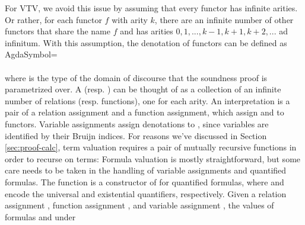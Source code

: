 \documentclass{lipics-v2021}
\begin{document}
For VTV, we avoid this issue by assuming that every functor has infinite arities.
Or rather, for each functor $f$ with arity $k$, there are an infinite number 
of other functors that share the name $f$ and has arities $0, 1, ..., k-1, k+1, k+2, ...$ 
ad infinitum. With this assumption, the denotation of functors can be defined as 
\AgdaSpace{}\AgdaSymbol{:}\AgdaSpace{}
\\
\AgdaSpace{}AgdaSymbol{=}\AgdaSpace{}\AgdaSpace{}\AgdaSpace{}\AgdaSpace{}
\\
\\[\AgdaEmptyExtraSkip]%
\AgdaSpace{}\AgdaSymbol{:}\AgdaSpace{}
\AgdaSpace{}\AgdaSymbol{=}\AgdaSpace{}\AgdaSpace{}\AgdaSpace{}\AgdaSpace{}
where  is the type of the domain of discourse that the 
soundness proof is parametrized over.
A  (resp. ) can be thought of as a 
collection of an infinite number of relations (resp. functions), one for 
each arity. An interpretation is a pair of a relation assignment and a 
function assignment, which assign  and  
to functors.
Variable assignments assign denotations to , since variables are 
identified by their Bruijn indices.
For reasons we've discussed in Section \ref{sec:proof-calc}, term valuation 
requires a pair of mutually recursive functions in order to recurse on terms:
Formula valuation is mostly straightforward, but some care needs to be taken 
in the handling of variable assignments and quantified formulas. 
The function  \AgdaSymbol{:}      
is a constructor of  for quantified formulas, where 
  and
  encode the universal and existential quantifiers, respectively.
Given a relation assignment ,
function assignment   , and
variable assignment   ,
the values of formulas 
   and
   under
\end{document}
